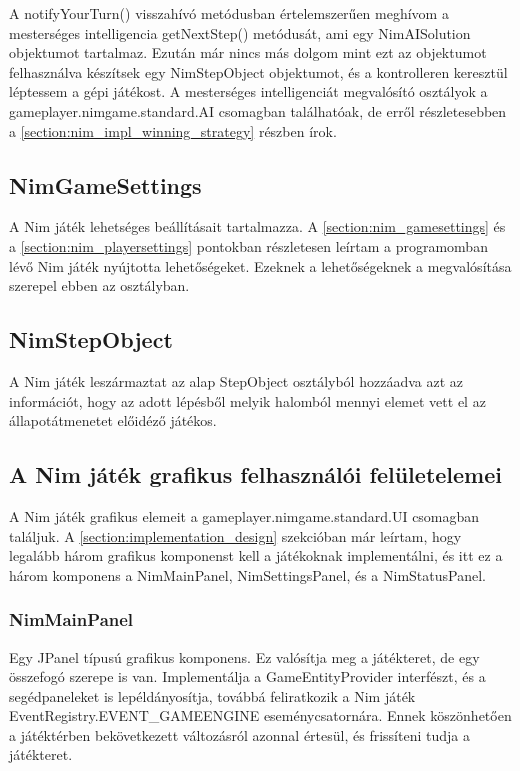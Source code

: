 A notifyYourTurn() visszahívó metódusban értelemszerűen meghívom a mesterséges intelligencia getNextStep() metódusát, ami egy NimAISolution objektumot tartalmaz. Ezután már nincs más dolgom mint ezt az objektumot felhasználva készítsek egy NimStepObject objektumot, és a kontrolleren keresztül léptessem a gépi játékost. A mesterséges intelligenciát megvalósító osztályok a gameplayer.nimgame.standard.AI csomagban találhatóak, de erről részletesebben a \ref*{section:nim_impl_winning_strategy} részben írok.

\subsection{NimGameSettings}
A Nim játék lehetséges beállításait tartalmazza. A \ref*{section:nim_gamesettings} és a \ref*{section:nim_playersettings} pontokban részletesen leírtam a programomban lévő Nim játék nyújtotta lehetőségeket. Ezeknek a lehetőségeknek a megvalósítása szerepel ebben az osztályban.

\subsection{NimStepObject}
A Nim játék leszármaztat az alap StepObject osztályból hozzáadva azt az információt, hogy az adott lépésből melyik halomból mennyi elemet vett el az állapotátmenetet előidéző játékos.

\subsection{A Nim játék grafikus felhasználói felületelemei}
A Nim játék grafikus elemeit a gameplayer.nimgame.standard.UI csomagban találjuk. A \ref*{section:implementation_design} szekcióban már leírtam, hogy legalább három grafikus komponenst kell a játékoknak implementálni, és itt ez a három komponens a NimMainPanel, NimSettingsPanel, és a NimStatusPanel.

\subsubsection{NimMainPanel}
Egy JPanel típusú grafikus komponens. Ez valósítja meg a játékteret, de egy összefogó szerepe is van. Implementálja a GameEntityProvider interfészt, és a segédpaneleket is lepéldányosítja, továbbá feliratkozik a Nim játék\\
EventRegistry.EVENT\_GAMEENGINE eseménycsatornára. Ennek köszönhetően a játéktérben bekövetkezett változásról azonnal értesül, és frissíteni tudja a játékteret.

